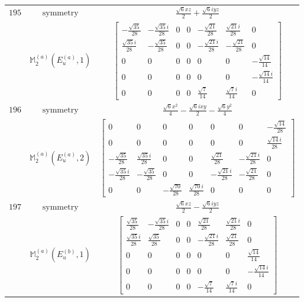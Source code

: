 \documentclass[fleqn,8pt,landscape]{jsarticle}
\begin{document}
\begin{longtable}{ccc}
$ 195 $ & $ \text{symmetry} $ & $ \frac{\sqrt{6} x z}{2} + \frac{\sqrt{6} i y z}{2} $ \\
$  $ & $ \mathbb{M}_{2}^{(a)}(E_{u}^{(a)},1) $ & $ \begin{bmatrix} - \frac{\sqrt{35}}{28} & - \frac{\sqrt{35} i}{28} & 0 & 0 & - \frac{\sqrt{21}}{28} & \frac{\sqrt{21} i}{28} & 0 \\ \frac{\sqrt{35} i}{28} & - \frac{\sqrt{35}}{28} & 0 & 0 & - \frac{\sqrt{21} i}{28} & - \frac{\sqrt{21}}{28} & 0 \\ 0 & 0 & 0 & 0 & 0 & 0 & - \frac{\sqrt{14}}{14} \\ 0 & 0 & 0 & 0 & 0 & 0 & - \frac{\sqrt{14} i}{14} \\ 0 & 0 & 0 & 0 & \frac{\sqrt{7}}{14} & \frac{\sqrt{7} i}{14} & 0 \end{bmatrix} $ \\ \hline
$ 196 $ & $ \text{symmetry} $ & $ \frac{\sqrt{6} x^{2}}{4} - \frac{\sqrt{6} i x y}{2} - \frac{\sqrt{6} y^{2}}{4} $ \\
$  $ & $ \mathbb{M}_{2}^{(a)}(E_{u}^{(a)},2) $ & $ \begin{bmatrix} 0 & 0 & 0 & 0 & 0 & 0 & - \frac{\sqrt{14}}{28} \\ 0 & 0 & 0 & 0 & 0 & 0 & \frac{\sqrt{14} i}{28} \\ - \frac{\sqrt{35}}{28} & \frac{\sqrt{35} i}{28} & 0 & 0 & \frac{\sqrt{21}}{28} & - \frac{\sqrt{21} i}{28} & 0 \\ - \frac{\sqrt{35} i}{28} & - \frac{\sqrt{35}}{28} & 0 & 0 & - \frac{\sqrt{21} i}{28} & - \frac{\sqrt{21}}{28} & 0 \\ 0 & 0 & - \frac{\sqrt{70}}{28} & \frac{\sqrt{70} i}{28} & 0 & 0 & 0 \end{bmatrix} $ \\ \hline
$ 197 $ & $ \text{symmetry} $ & $ \frac{\sqrt{6} x z}{2} - \frac{\sqrt{6} i y z}{2} $ \\
$  $ & $ \mathbb{M}_{2}^{(a)}(E_{u}^{(b)},1) $ & $ \begin{bmatrix} \frac{\sqrt{35}}{28} & - \frac{\sqrt{35} i}{28} & 0 & 0 & \frac{\sqrt{21}}{28} & \frac{\sqrt{21} i}{28} & 0 \\ \frac{\sqrt{35} i}{28} & \frac{\sqrt{35}}{28} & 0 & 0 & - \frac{\sqrt{21} i}{28} & \frac{\sqrt{21}}{28} & 0 \\ 0 & 0 & 0 & 0 & 0 & 0 & \frac{\sqrt{14}}{14} \\ 0 & 0 & 0 & 0 & 0 & 0 & - \frac{\sqrt{14} i}{14} \\ 0 & 0 & 0 & 0 & - \frac{\sqrt{7}}{14} & \frac{\sqrt{7} i}{14} & 0 \end{bmatrix} $ \\ \hline

\end{longtable}
\end{document}
